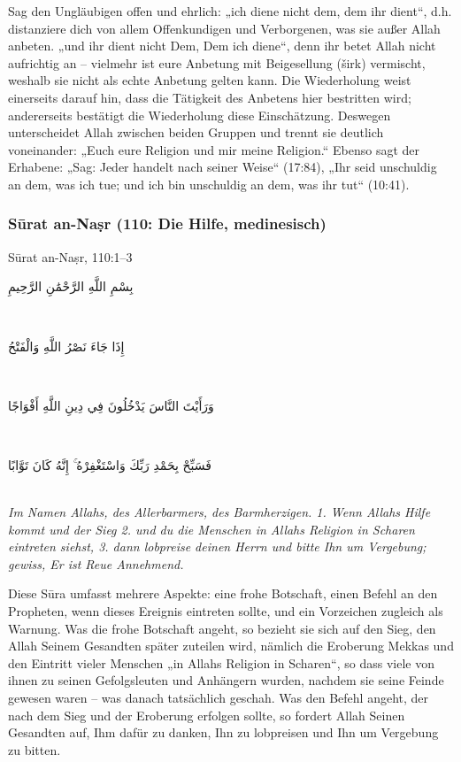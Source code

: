 Sag den Ungläubigen offen und ehrlich: „ich diene nicht dem, dem ihr dient“, d.h. distanziere
dich von allem Offenkundigen und Verborgenen, was sie außer Allah anbeten. „und ihr dient
nicht Dem, Dem ich diene“, denn ihr betet Allah nicht aufrichtig an – vielmehr ist eure Anbetung
mit Beigesellung (širk) vermischt, weshalb sie nicht als echte Anbetung gelten kann. Die
Wiederholung weist einerseits darauf hin, dass die Tätigkeit des Anbetens hier bestritten wird;
andererseits bestätigt die Wiederholung diese Einschätzung. Deswegen unterscheidet Allah
zwischen beiden Gruppen und trennt sie deutlich voneinander: „Euch eure Religion und mir
meine Religion.“ Ebenso sagt der Erhabene: „Sag: Jeder handelt nach seiner Weise“ (17:84),
„Ihr seid unschuldig an dem, was ich tue; und ich bin unschuldig an dem, was ihr tut“ (10:41).

\subsubsection*{Sūrat an-Naṣr (110: Die Hilfe, medinesisch)}

\begin{quranvers}{Sūrat an-Naṣr, 110:1--3}
{\quranfont\begin{Arabic}
بِسْمِ اللَّهِ الرَّحْمَٰنِ الرَّحِيمِ
\end{Arabic}}\\[2mm]
{\quranfont\begin{Arabic}
إِذَا جَاءَ نَصْرُ اللَّهِ وَالْفَتْحُ
\end{Arabic}}\\[2mm]
{\quranfont\begin{Arabic}
وَرَأَيْتَ النَّاسَ يَدْخُلُونَ فِي دِينِ اللَّهِ أَفْوَاجًا
\end{Arabic}}\\[2mm]
{\quranfont\begin{Arabic}
فَسَبِّحْ بِحَمْدِ رَبِّكَ وَاسْتَغْفِرْهُ ۚ إِنَّهُ كَانَ تَوَّابًا
\end{Arabic}}\\[3mm]
\emph{Im Namen Allahs, des Allerbarmers, des Barmherzigen. 1. Wenn Allahs Hilfe kommt und der
Sieg 2. und du die Menschen in Allahs Religion in Scharen eintreten siehst, 3. dann lobpreise
deinen Herrn und bitte Ihn um Vergebung; gewiss, Er ist Reue Annehmend.}
\end{quranvers}

Diese Sūra umfasst mehrere Aspekte: eine frohe Botschaft, einen Befehl an den Propheten, wenn
dieses Ereignis eintreten sollte, und ein Vorzeichen zugleich als Warnung. Was die frohe
Botschaft angeht, so bezieht sie sich auf den Sieg, den Allah Seinem Gesandten später zuteilen
wird, nämlich die Eroberung Mekkas und den Eintritt vieler Menschen „in Allahs Religion in
Scharen“, so dass viele von ihnen zu seinen Gefolgsleuten und Anhängern wurden, nachdem sie
seine Feinde gewesen waren – was danach tatsächlich geschah. Was den Befehl angeht, der
nach dem Sieg und der Eroberung erfolgen sollte, so fordert Allah Seinen Gesandten auf, Ihm
dafür zu danken, Ihn zu lobpreisen und Ihn um Vergebung zu bitten.

